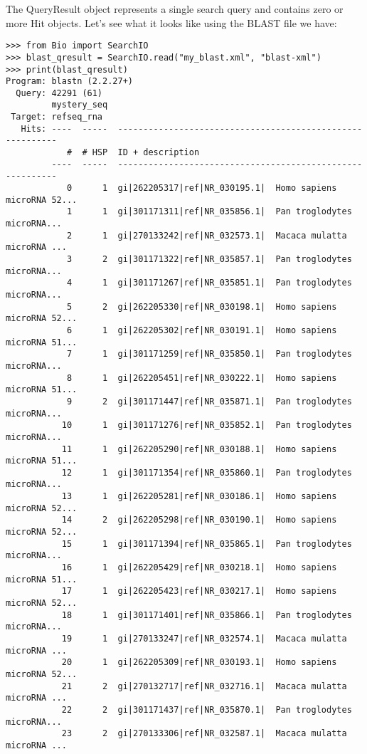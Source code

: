 The QueryResult object represents a single search query and contains zero or
more Hit objects. Let's see what it looks like using the BLAST file we have:

\begin{verbatim}
>>> from Bio import SearchIO
>>> blast_qresult = SearchIO.read("my_blast.xml", "blast-xml")
>>> print(blast_qresult)
Program: blastn (2.2.27+)
  Query: 42291 (61)
         mystery_seq
 Target: refseq_rna
   Hits: ----  -----  ----------------------------------------------------------
            #  # HSP  ID + description
         ----  -----  ----------------------------------------------------------
            0      1  gi|262205317|ref|NR_030195.1|  Homo sapiens microRNA 52...
            1      1  gi|301171311|ref|NR_035856.1|  Pan troglodytes microRNA...
            2      1  gi|270133242|ref|NR_032573.1|  Macaca mulatta microRNA ...
            3      2  gi|301171322|ref|NR_035857.1|  Pan troglodytes microRNA...
            4      1  gi|301171267|ref|NR_035851.1|  Pan troglodytes microRNA...
            5      2  gi|262205330|ref|NR_030198.1|  Homo sapiens microRNA 52...
            6      1  gi|262205302|ref|NR_030191.1|  Homo sapiens microRNA 51...
            7      1  gi|301171259|ref|NR_035850.1|  Pan troglodytes microRNA...
            8      1  gi|262205451|ref|NR_030222.1|  Homo sapiens microRNA 51...
            9      2  gi|301171447|ref|NR_035871.1|  Pan troglodytes microRNA...
           10      1  gi|301171276|ref|NR_035852.1|  Pan troglodytes microRNA...
           11      1  gi|262205290|ref|NR_030188.1|  Homo sapiens microRNA 51...
           12      1  gi|301171354|ref|NR_035860.1|  Pan troglodytes microRNA...
           13      1  gi|262205281|ref|NR_030186.1|  Homo sapiens microRNA 52...
           14      2  gi|262205298|ref|NR_030190.1|  Homo sapiens microRNA 52...
           15      1  gi|301171394|ref|NR_035865.1|  Pan troglodytes microRNA...
           16      1  gi|262205429|ref|NR_030218.1|  Homo sapiens microRNA 51...
           17      1  gi|262205423|ref|NR_030217.1|  Homo sapiens microRNA 52...
           18      1  gi|301171401|ref|NR_035866.1|  Pan troglodytes microRNA...
           19      1  gi|270133247|ref|NR_032574.1|  Macaca mulatta microRNA ...
           20      1  gi|262205309|ref|NR_030193.1|  Homo sapiens microRNA 52...
           21      2  gi|270132717|ref|NR_032716.1|  Macaca mulatta microRNA ...
           22      2  gi|301171437|ref|NR_035870.1|  Pan troglodytes microRNA...
           23      2  gi|270133306|ref|NR_032587.1|  Macaca mulatta microRNA ...

\end{verbatim}

